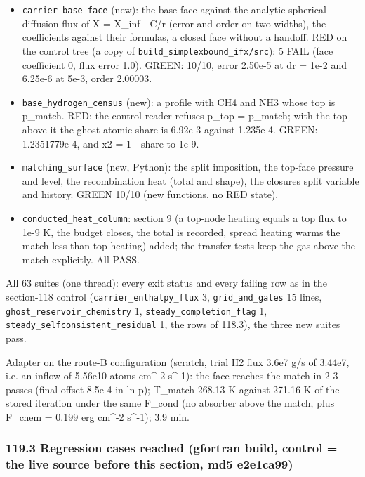 \documentclass[english,a4paper]{my_memo}
\providecommand{\tightlist}{\setlength{\itemsep}{0pt}\setlength{\parskip}{0pt}}
\begin{document}
\begin{itemize}
\tightlist
\item
  \texttt{carrier\_base\_face} (new): the base face against the analytic spherical
  diffusion flux of X = X\_inf - C/r (error and order on two widths), the
  coefficients against their formulas, a closed face without a handoff.
  RED on the control tree (a copy of \texttt{build\_simplexbound\_ifx/src}): 5 FAIL
  (face coefficient 0, flux error 1.0). GREEN: 10/10, error 2.50e-5 at
  dr = 1e-2 and 6.25e-6 at 5e-3, order 2.00003.
\item
  \texttt{base\_hydrogen\_census} (new): a profile with CH4 and NH3 whose top is
  p\_match. RED: the control reader refuses p\_top = p\_match; with the top
  above it the ghost atomic share is 6.92e-3 against 1.235e-4. GREEN:
  1.2351779e-4, and x2 = 1 - share to 1e-9.
\item
  \texttt{matching\_surface} (new, Python): the split imposition, the top-face
  pressure and level, the recombination heat (total and shape), the closure\textquotesingle s
  split variable and history. GREEN 10/10 (new functions, no RED state).
\item
  \texttt{conducted\_heat\_column}: section 9 (a top-node heating equals a top flux to
  1e-9 K, the budget closes, the total is recorded, spread heating warms the
  match less than top heating) added; the transfer tests keep the gas above
  the match explicitly. All PASS.
\end{itemize}

All 63 suites (one thread): every exit status and every failing row as in the
section-118 control (\texttt{carrier\_enthalpy\_flux} 3, \texttt{grid\_and\_gates} 15 lines,
\texttt{ghost\_reservoir\_chemistry} 1, \texttt{steady\_completion\_flag} 1,
\texttt{steady\_selfconsistent\_residual} 1, the rows of 118.3), the three new suites
pass.

Adapter on the route-B configuration (scratch, trial H2 flux 3.6e7 g/s of
3.44e7, i.e. an inflow of 5.56e10 atoms cm\^{}-2 s\^{}-1): the face reaches the
match in 2-3 passes (final offset 8.5e-4 in ln p); T\_match 268.13 K against
271.16 K of the stored iteration under the same F\_cond (no absorber above the
match, plus F\_chem = 0.199 erg cm\^{}-2 s\^{}-1); 3.9 min.

\subsubsection{119.3 Regression cases reached (gfortran build, control = the live source before this section, md5 e2e1ca99)}\label{1193-regression-cases-reached-gfortran-build-control--the-live-source-before-this-section-md5-e2e1ca99}
\end{document}
